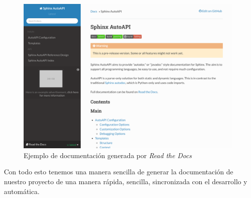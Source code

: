 \documentclass[a4paper, 12pt]{book}
\begin{document}
\begin{figure}[H]
    \centering
    \includegraphics[scale=0.25]{img/example_RTD.png}
    \caption{Ejemplo de documentación generada por \emph{Read the Docs}}
    \label{fig:exampleRTD}
\end{figure}
Con todo esto tenemos una manera sencilla de generar la documentación de nuestro proyecto de una manera rápida, sencilla, sincronizada con el desarrollo y automática.


\end{document}
